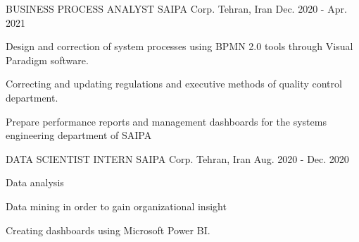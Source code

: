 

\begin{cventries}

  \cventry
    {BUSINESS PROCESS ANALYST} %
    {SAIPA Corp.} %
    {Tehran, Iran} %
    {Dec. 2020 - Apr. 2021} %
    {
      \begin{cvitems} %
        \item {Design and correction of system processes using BPMN 2.0 tools through Visual Paradigm software.}
        \item {Correcting and updating regulations and executive methods of quality control department.}
        \item {Prepare performance reports and management dashboards for the systems engineering department of SAIPA}
      \end{cvitems}
    }

  \cventry
    {DATA SCIENTIST INTERN} %
    {SAIPA Corp.} %
    {Tehran, Iran} %
    {Aug. 2020 - Dec. 2020} %
    {
      \begin{cvitems} %
        \item {Data analysis}
        \item {Data mining in order to gain organizational insight}
        \item {Creating dashboards using Microsoft Power BI.}
      \end{cvitems}
    }

\end{cventries}

